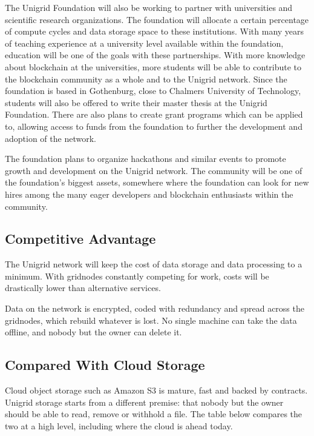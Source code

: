 \documentclass[a4paper,oneside]{article}
\begin{document}
\noindent The Unigrid Foundation will also be working to partner with universities and scientific research organizations. The foundation will allocate a certain percentage of compute cycles and data storage space to these institutions. With many years of teaching experience at a university level available within the foundation, education will be one of the goals with these partnerships. With more knowledge about blockchain at the universities, more students will be able to contribute to the blockchain community as a whole and to the Unigrid network. Since the foundation is based in Gothenburg, close to Chalmers University of Technology, students will also be offered to write their master thesis at the Unigrid Foundation. There are also plans to create grant programs which can be applied to, allowing access to funds from the foundation to further the development and adoption of the network. 

The foundation plans to organize hackathons and similar events to promote growth and development on the Unigrid network. The community will be one of the foundation's biggest assets, somewhere where the foundation can look for new hires among the many eager developers and blockchain enthusiasts within the community.

\subsection{Competitive Advantage}
The Unigrid network will keep the cost of data storage and data processing to a minimum. With gridnodes constantly competing for work, costs will be drastically lower than alternative services.

\noindent Data on the network is encrypted, coded with redundancy and spread across the gridnodes, which rebuild whatever is lost. No single machine can take the data offline, and nobody but the owner can delete it.

\subsection{Compared With Cloud Storage}
Cloud object storage such as Amazon S3 is mature, fast and backed by contracts. Unigrid storage starts from a different premise: that nobody but the owner should be able to read, remove or withhold a file. The table below compares the two at a high level, including where the cloud is ahead today.
\end{document}
